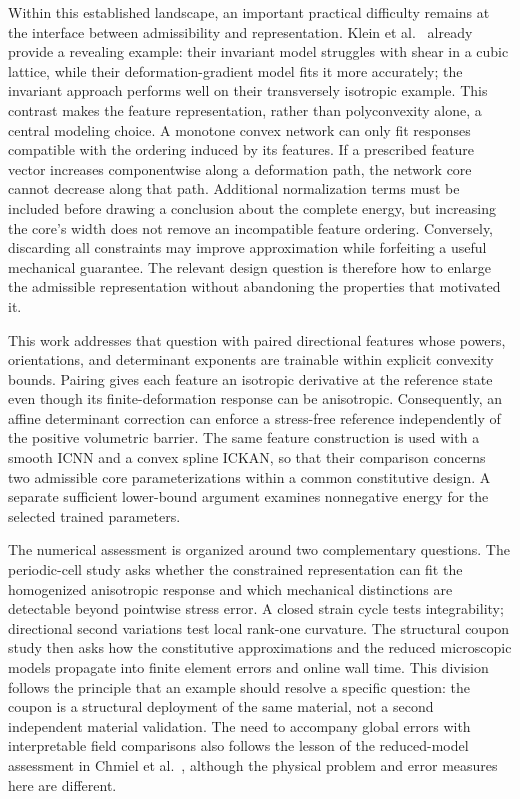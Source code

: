 Within this established landscape, an important practical difficulty remains at the interface between admissibility and representation. Klein et al.~\cite{klein2022} already provide a revealing example: their invariant model struggles with shear in a cubic lattice, while their deformation-gradient model fits it more accurately; the invariant approach performs well on their transversely isotropic example. This contrast makes the feature representation, rather than polyconvexity alone, a central modeling choice. A monotone convex network can only fit responses compatible with the ordering induced by its features. If a prescribed feature vector increases componentwise along a deformation path, the network core cannot decrease along that path. Additional normalization terms must be included before drawing a conclusion about the complete energy, but increasing the core's width does not remove an incompatible feature ordering. Conversely, discarding all constraints may improve approximation while forfeiting a useful mechanical guarantee. The relevant design question is therefore how to enlarge the admissible representation without abandoning the properties that motivated it.

This work addresses that question with paired directional features whose powers, orientations, and determinant exponents are trainable within explicit convexity bounds. Pairing gives each feature an isotropic derivative at the reference state even though its finite-deformation response can be anisotropic. Consequently, an affine determinant correction can enforce a stress-free reference independently of the positive volumetric barrier. The same feature construction is used with a smooth ICNN and a convex spline ICKAN, so that their comparison concerns two admissible core parameterizations within a common constitutive design. A separate sufficient lower-bound argument examines nonnegative energy for the selected trained parameters.

The numerical assessment is organized around two complementary questions. The periodic-cell study asks whether the constrained representation can fit the homogenized anisotropic response and which mechanical distinctions are detectable beyond pointwise stress error. A closed strain cycle tests integrability; directional second variations test local rank-one curvature. The structural coupon study then asks how the constitutive approximations and the reduced microscopic models propagate into finite element errors and online wall time. This division follows the principle that an example should resolve a specific question: the coupon is a structural deployment of the same material, not a second independent material validation. The need to accompany global errors with interpretable field comparisons also follows the lesson of the reduced-model assessment in Chmiel et al.~\cite{Chmiel2024}, although the physical problem and error measures here are different.

